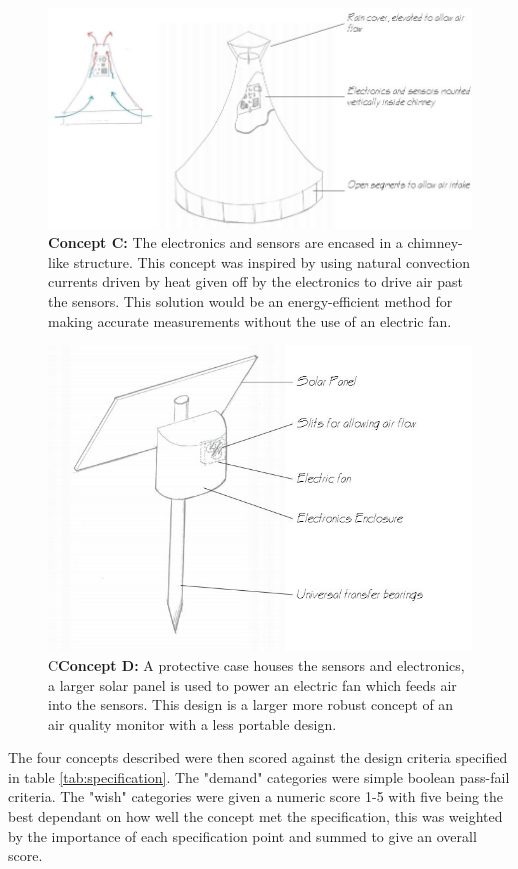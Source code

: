 \begin{figure}[H]
\centering
\includegraphics[width=0.6\linewidth]{Engineering_hardware/Engineering_hardware_Figures/Concept_chimney.JPG}
\caption{\textbf{Concept C:} The electronics and sensors are encased in a chimney-like structure. This concept was inspired by using natural convection currents driven by heat given off by the electronics to drive air past the sensors. This solution would be an energy-efficient method for making accurate measurements without the use of an electric fan.}
\label{fig:15cm_shell_loading}
\end{figure}


\begin{figure}[H]
\centering
\includegraphics[width=0.6\linewidth]{Engineering_hardware/Engineering_hardware_Figures/Concept_stake.JPG}
\caption{C\textbf{Concept D:} A protective case houses the sensors and electronics, a larger solar panel is used to power an electric fan which feeds air into the sensors. This design is a larger more robust concept of an air quality monitor with a less portable design.}
\label{fig:15cm_shell_loading}
\end{figure}

The four concepts described were then scored against the design criteria specified in table \ref{tab:specification}. The "demand" categories were simple boolean pass-fail criteria. The "wish" categories were given a numeric score 1-5 with five being the best dependant on how well the concept met the specification, this was weighted by the importance of each specification point and summed to give an overall score.

